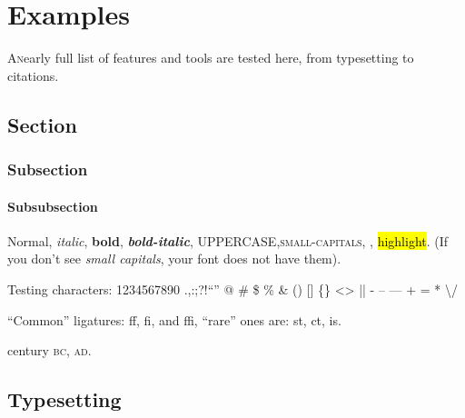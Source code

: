 \chapter{Examples}
\label{ch:chapter}

\lettrine[lines=\iniciale, slope=0.5em, lraise=0, nindent=1em, findent=-1em]%
{\textcolor{\accentcolor}{A}} nearly full list of features and tools are tested here, from typesetting to citations. \blindtext

\section{Section}

\subsection{Subsection}

\subsubsection{Subsubsection}

Normal, \textit{italic}, \textbf{bold}, \textbf{\textit{bold-italic}}, UPPERCASE,\textsc{small-capitals}, , \hl{highlight}. (If you don't see \emph{small capitals}, your font does not have them).

\noindent Testing characters: 1234567890 .,:;?!``'' @ \# \$ \% \& \* () [] \{\} <> || - -- --- + = * \textbackslash /

\noindent ``Common'' ligatures: ff, fi, and ffi, ``rare'' ones are: st, ct, is. 

     century \textsc{bc}, \textsc{ad}.

\section{Typesetting}

